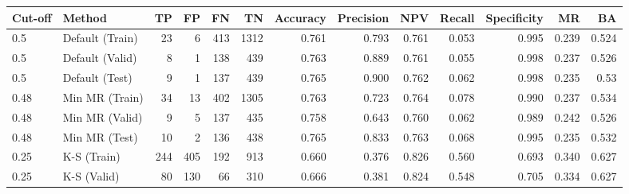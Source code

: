 \begin{table}[H]
	\centering
	\resizebox{\textwidth}{!}
	{
		\begin{tabular}{l|l|r|r|r|r|r|r|r|r|r|r|r}
			\hline
			\textbf{Cut-off} & \textbf{Method}       & \textbf{TP} & \textbf{FP} & \textbf{FN} & \textbf{TN} & \textbf{Accuracy} & \textbf{Precision} & \textbf{NPV} & \textbf{Recall} & \textbf{Specificity} & \textbf{MR} & \textbf{BA} \\ \hline
			0.5              & Default (Train)       & 23          & 6           & 413         & 1312        & 0.761             & 0.793              & 0.761        & 0.053           & 0.995                & 0.239  & 0.524      \\
			0.5              & Default (Valid)       & 8           & 1           & 138         & 439         & 0.763             & 0.889              & 0.761        & 0.055           & 0.998                & 0.237   & 0.526    \\
			0.5              & Default (Test)        & 9           & 1           & 137         & 439         & 0.765             & 0.900              & 0.762        & 0.062           & 0.998                & 0.235      & 0.53  \\ \hline
			0.48             & Min MR (Train)        & 34          & 13          & 402         & 1305        & 0.763             & 0.723              & 0.764        & 0.078           & 0.990                & 0.237     & 0.534  \\
			0.48             & Min MR (Valid)        & 9           & 5           & 137         & 435         & \cellcolor{yellow!25}0.758             & \cellcolor{yellow!25}0.643              & 0.760        & 0.062           & \cellcolor{yellow!25}0.989                & \cellcolor{yellow!25}0.242       & 0.526 \\
			0.48             & Min MR (Test)         & 10          & 2           & 136         & 438         & 0.765             & 0.833              & 0.763        & 0.068           & 0.995                & 0.235    & 0.532   \\ \hline
			0.25             & K-S (Train) & 244         & 405         & 192         & 913         & 0.660             & 0.376              & 0.826        & 0.560           & 0.693                & 0.340  & 0.627     \\
			0.25             & K-S (Valid) & 80          & 130         & 66          & 310         & 0.666             & 0.381              & \cellcolor{yellow!25}0.824        & \cellcolor{yellow!25}0.548           & 0.705                & 0.334     & \cellcolor{yellow!25}0.627  \\

\end{tabular}}
\end{table}
